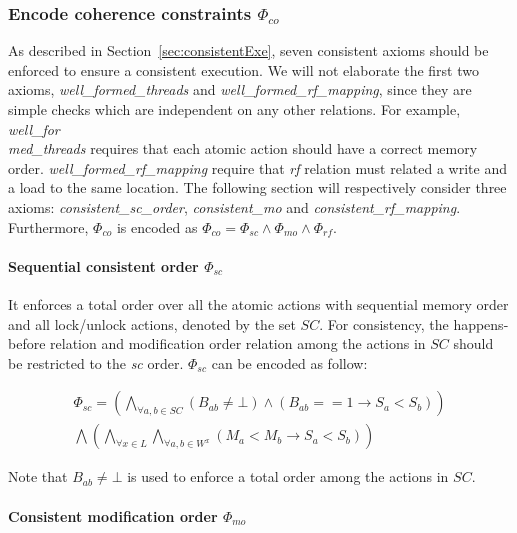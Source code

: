 \documentclass[preprint, numbers, 10pt]{sigplanconf}
\begin{document}
\subsubsection{Encode coherence constraints $\Phi_{co}$}

As described in Section~\ref{sec:consistentExe}, seven consistent axioms should be 
enforced to ensure a consistent execution. We will not elaborate the first two axioms, 
\textit{well\_formed\_threads} and \textit{well\_formed\_rf\_mapping}, since they
are simple checks which are independent on any other relations. For example, 
\textit{well\_for\\med\_threads} requires that each atomic action should have a correct
memory order. \textit{well\_formed\_rf\_mapping} require that \textit{rf} relation must related a write and 
a load to the same location. The following section will respectively consider three axioms:
\textit{consistent\_sc\_order}, \textit{consistent\_mo} and \textit{consistent\_rf\_mapping}.
Furthermore, $\Phi_{co}$ is encoded as $\Phi_{co}=\Phi_{sc}\wedge\Phi_{mo}\wedge\Phi_{rf}$. 

\paragraph{Sequential consistent order $\Phi_{sc}$}

It enforces a total order over all the atomic actions with sequential memory order and 
all lock/unlock actions, denoted by the set $SC$. 
For consistency, the happens-before relation and modification order relation among the actions
in $SC$ should be restricted to the \textit{sc} order. 
$\Phi_{sc}$ can be encoded as follow: 

\begin{equation}
\begin{aligned}
\Phi_{sc} = (\bigwedge_{\forall a,b\in SC}(B_{ab}\neq \bot)\wedge (B_{ab}==1\rightarrow S_a<S_b)) \\
                   \bigwedge (\bigwedge_{\forall x\in L}\bigwedge_{\forall a,b\in W^x} (M_a<M_b\rightarrow S_a<S_b))
\end{aligned}
\end{equation} 

Note that $B_{ab}\neq \bot$ is used to enforce a total order among the actions
in $SC$. 


\paragraph{Consistent modification order $\Phi_{mo}$}
\end{document}
